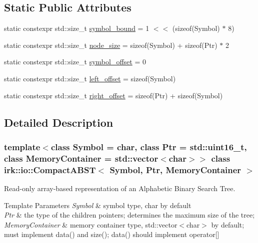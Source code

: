 \subsection*{Static Public Attributes}
\begin{DoxyCompactItemize}
\item 
static constexpr std\+::size\+\_\+t \mbox{\hyperlink{classirk_1_1io_1_1CompactABST_abdb9153cd0b7ebd701fbdd12c5a6b1e0}{symbol\+\_\+bound}} = 1 $<$$<$ (sizeof(Symbol) $\ast$ 8)
\item 
static constexpr std\+::size\+\_\+t \mbox{\hyperlink{classirk_1_1io_1_1CompactABST_a7d730c8d8ba0519397927b08dea7dbbb}{node\+\_\+size}} = sizeof(Symbol) + sizeof(Ptr) $\ast$ 2
\item 
static constexpr std\+::size\+\_\+t \mbox{\hyperlink{classirk_1_1io_1_1CompactABST_a98a8a4bc4fe63cfcf02f636abc208096}{symbol\+\_\+offset}} = 0
\item 
static constexpr std\+::size\+\_\+t \mbox{\hyperlink{classirk_1_1io_1_1CompactABST_a3a2aa7c2af6de1ddfc8ee25d42d700e5}{left\+\_\+offset}} = sizeof(Symbol)
\item 
static constexpr std\+::size\+\_\+t \mbox{\hyperlink{classirk_1_1io_1_1CompactABST_acfc39a4d86afda151c70354230614cb4}{right\+\_\+offset}} = sizeof(Ptr) + sizeof(Symbol)
\end{DoxyCompactItemize}


\subsection{Detailed Description}
\subsubsection*{template$<$class Symbol = char, class Ptr = std\+::uint16\+\_\+t, class Memory\+Container = std\+::vector$<$char$>$$>$\newline
class irk\+::io\+::\+Compact\+A\+B\+S\+T$<$ Symbol, Ptr, Memory\+Container $>$}

Read-\/only array-\/based representation of an Alphabetic Binary Search Tree. 


\begin{DoxyTemplParams}{Template Parameters}
{\em Symbol} & symbol type, {\ttfamily char} by default \\
\hline
{\em Ptr} & the type of the children pointers; determines the maximum size of the tree; \\
\hline
{\em Memory\+Container} & memory container type, std\+::vector$<$char$>$ by default; must implement data() and size(); data() should implement operator\mbox{[}\mbox{]} \\
\hline
\end{DoxyTemplParams}


